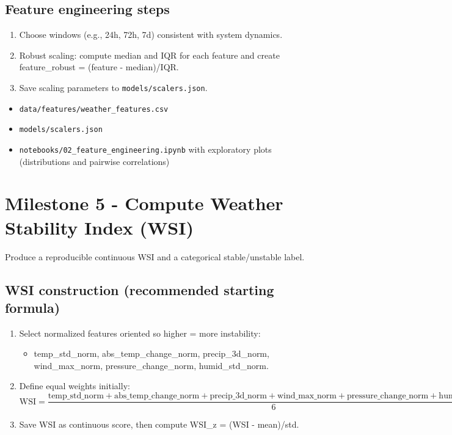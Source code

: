 \documentclass[11pt,a4paper]{article}
\begin{document}
\subsection{Feature engineering steps}
\begin{enumerate}[label=\arabic*.]
    \item Choose windows (e.g., 24h, 72h, 7d) consistent with system dynamics.
    \item Robust scaling: compute median and IQR for each feature and create feature\_robust = (feature - median)/IQR.
    \item Save scaling parameters to \texttt{models/scalers.json}.
\end{enumerate}

\begin{deliverablebox}
\begin{itemize}
    \item \texttt{data/features/weather\_features.csv}
    \item \texttt{models/scalers.json}
    \item \texttt{notebooks/02\_feature\_engineering.ipynb} with exploratory plots (distributions and pairwise correlations)
\end{itemize}
\end{deliverablebox}

\section{Milestone 5 - Compute Weather Stability Index (WSI)}

\begin{objectivebox}
Produce a reproducible continuous WSI and a categorical stable/unstable label.
\end{objectivebox}

\subsection{WSI construction (recommended starting formula)}

\begin{enumerate}[label=\arabic*.]
    \item Select normalized features oriented so higher = more instability:
    \begin{itemize}
        \item temp\_std\_norm, abs\_temp\_change\_norm, precip\_3d\_norm, wind\_max\_norm, pressure\_change\_norm, humid\_std\_norm.
    \end{itemize}
    
    \item Define equal weights initially:
    \begin{equation}
    \text{WSI} = \frac{\text{temp\_std\_norm} + \text{abs\_temp\_change\_norm} + \text{precip\_3d\_norm} + \text{wind\_max\_norm} + \text{pressure\_change\_norm} + \text{humid\_std\_norm}}{6}
    \end{equation}
    
    \item Save WSI as continuous score, then compute WSI\_z = (WSI - mean)/std.
\end{enumerate}
\end{document}
